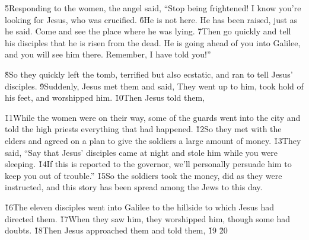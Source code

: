 \v{5}Responding to the women, the angel said, ``Stop being frightened! I know you're looking for Jesus, who was crucified. \v{6}He is not here. He has been raised, just as he said. Come and see the place where he was lying. \v{7}Then go quickly and tell his disciples that he is risen from the dead. He is going ahead of you into Galilee, and you will see him there. Remember, I have told you!''

\v{8}So they quickly left the tomb, terrified but also ecstatic, and ran to tell Jesus' disciples. \v{9}Suddenly, Jesus met them and said,  They went up to him, took hold of his feet, and worshipped him. \v{10}Then Jesus told them, 

\v{11}While the women were on their way, some of the guards went into the city and told the high priests everything that had happened. \v{12}So they met with the elders and agreed on a plan to give the soldiers a large amount of money. \v{13}They said, ``Say that Jesus' disciples came at night and stole him while you were sleeping. \v{14}If this is reported to the governor, we'll personally persuade him to keep you out of trouble.'' \v{15}So the soldiers took the money, did as they were instructed, and this story has been spread among the Jews to this day.

\v{16}The eleven disciples went into Galilee to the hillside to which Jesus had directed them. \v{17}When they saw him, they worshipped him, though some had doubts. \v{18}Then Jesus approached them and told them,  \v{19} \v{20}
